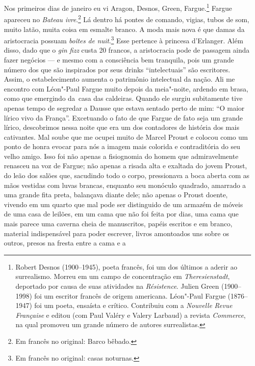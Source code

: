 Nos primeiros dias de janeiro eu vi Aragon,
Desnos, Green, Fargue.\footnote{Robert Desnos (1900--1945), poeta
  francês, foi um dos últimos a aderir ao surrealismo. Morreu em um
  campo de concentração em \emph{Theresienstadt}, deportado por causa de
  suas atividades na \emph{Résistence}. Julien Green (1900--1998) foi um
  escritor francês de origem americana. Léon"-Paul Fargue (1876--1947) foi um
  poeta, ensaísta e crítico. Contribuiu com a \emph{Nouvelle Revue
  Française} e editou (com Paul Valéry e Valery Larbaud) a revista
  \emph{Commerce}, na qual promoveu um grande número de autores
  surrealistas. \versal{[N.~O.]}} Fargue apareceu no \emph{Bateau ivre}.\footnote{Em francês no original: Barco bêbado. \versal{[N.~T.]}} Lá dentro há
pontes de comando, vigias, tubos de som, muito latão, muita coisa em
esmalte branco. A moda mais nova é que damas da aristocracia possuam
\emph{boîtes de nuit}.\footnote{Em francês no original: casas noturnas. \versal{[N.~T.]}} Esse pertence à princesa d'Erlanger. Além disso, dado que
o \emph{gin fizz} custa 20 francos, a aristocracia pode de passagem
ainda fazer negócios --- e mesmo com a consciência bem tranquila, pois um
grande número dos que são inspirados por seus drinks ``intelectuais'' são escritores.
Assim, o estabelecimento aumenta o patrimônio intelectual da nação. Ali me
encontro com Léon"-Paul Fargue muito depois da meia"-noite, ardendo em
brasa, como que emergindo da~casa das caldeiras. Quando ele surgiu
subitamente tive apenas tempo de segredar a Dausse que estava sentado
perto de mim: ``O maior lírico vivo da França''. Excetuando o fato de
que Fargue de fato seja um grande lírico, descobrimos nessa noite que
era um dos contadores de história dos mais cativantes. Mal soube que me
ocupei muito de Marcel Proust e colocou como um ponto de honra evocar
para nós a imagem mais colorida e contraditória do seu velho amigo. Isso
foi não apenas a fisiognomia do homem que admiravelmente renasceu na voz
de Fargue; não apenas a risada alta e exaltada do jovem Proust, do leão
dos salões que, sacudindo todo o corpo, pressionava a boca aberta com as
mãos vestidas com luvas brancas, enquanto seu monóculo quadrado,
amarrado a uma grande fita preta, balançava diante dele; não apenas o
Proust doente, vivendo em um quarto que mal pode ser distinguido de um
armazém de móveis de uma casa de leilões, em um cama que não foi feita
por dias, uma cama que mais parece uma caverna cheia de manuscritos,
papéis escritos e em branco, material indispensável para poder escrever,
livros amontoados uns sobre os outros, presos na fresta entre a cama e a

